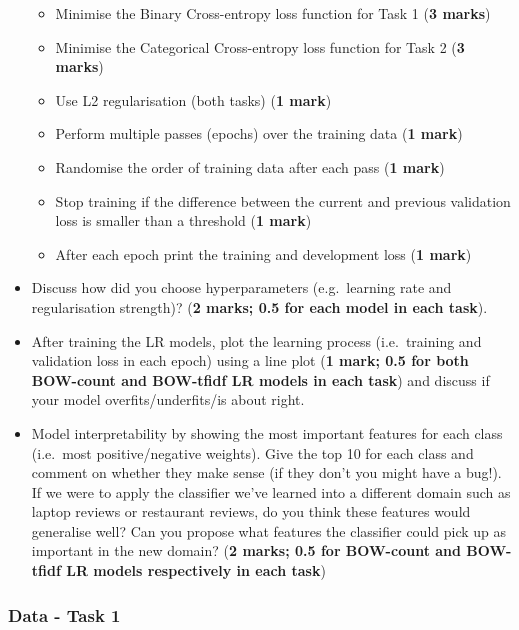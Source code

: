 \documentclass[11pt]{article}
\providecommand{\tightlist}{%
      \setlength{\itemsep}{0pt}\setlength{\parskip}{0pt}}
\begin{document}
\begin{itemize}
  \begin{itemize}
  \tightlist
  \item
    Minimise the Binary Cross-entropy loss function for Task 1
    (\textbf{3 marks})
  \item
    Minimise the Categorical Cross-entropy loss function for Task 2
    (\textbf{3 marks})
  \item
    Use L2 regularisation (both tasks) (\textbf{1 mark})
  \item
    Perform multiple passes (epochs) over the training data (\textbf{1
    mark})
  \item
    Randomise the order of training data after each pass (\textbf{1
    mark})
  \item
    Stop training if the difference between the current and previous
    validation loss is smaller than a threshold (\textbf{1 mark})
  \item
    After each epoch print the training and development loss (\textbf{1
    mark})
  \end{itemize}
\item
  Discuss how did you choose hyperparameters (e.g.~learning rate and
  regularisation strength)? (\textbf{2 marks; 0.5 for each model in each
  task}).
\item
  After training the LR models, plot the learning process (i.e.~training
  and validation loss in each epoch) using a line plot (\textbf{1 mark;
  0.5 for both BOW-count and BOW-tfidf LR models in each task}) and
  discuss if your model overfits/underfits/is about right.
\item
  Model interpretability by showing the most important features for each
  class (i.e.~most positive/negative weights). Give the top 10 for each
  class and comment on whether they make sense (if they don't you might
  have a bug!). If we were to apply the classifier we've learned into a
  different domain such as laptop reviews or restaurant reviews, do you
  think these features would generalise well? Can you propose what
  features the classifier could pick up as important in the new domain?
  (\textbf{2 marks; 0.5 for BOW-count and BOW-tfidf LR models
  respectively in each task})
\end{itemize}

\hypertarget{data---task-1}{%
\subsubsection{Data - Task 1}\label{data---task-1}}
\end{document}
